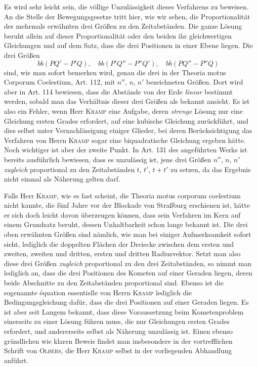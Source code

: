 Es wird sehr leicht sein, die völlige Unzulässigkeit dieses Verfahrens zu beweisen. An die Stelle der Bewegungsgesetze tritt hier, wie wir sehen, die Proportionalität der mehrmals erwähnten drei Größen zu den Zeitabständen. Die ganze Lösung beruht allein auf dieser Proportionalität oder den beiden ihr gleichwertigen Gleichungen und auf dem Satz, dass die drei Positionen in einer Ebene liegen. Die drei Größen
\[
bb(PQ'-P'Q), \quad bb(P'Q''-P''Q'), \quad bb(PQ''-P''Q)
\]
sind, wie man sofort bemerken wird, genau die drei in der Theoria motus Corporum Coelestium, Art. 112, mit $n''$, $n$, $n'$ bezeichneten Größen. Dort wird aber in Art. 114 bewiesen, dass die Abstände von der Erde \emph{linear} bestimmt werden, sobald man das Verhältnis dieser drei Größen als bekannt ansieht. Es ist also ein Fehler, wenn Herr \textsc{Kramp} eine Aufgabe, deren \emph{strenge} Lösung nur eine Gleichung ersten Grades erfordert, auf eine kubische Gleichung zurückführt, und dies selbst unter Vernachlässigung einiger Glieder, bei deren Berücksichtigung das Verfahren von Herrn \textsc{Kramp} sogar eine biquadratische Gleichung ergeben hätte. Noch wichtiger ist aber der zweite Punkt. In Art. 131 des angeführten Werks ist bereits ausführlich bewiesen, dass es unzulässig ist, jene drei Größen $n''$, $n$, $n'$ \emph{zugleich} proportional zu den Zeitabständen $t$, $t'$, $t+t'$ zu setzen, da das Ergebnis nicht einmal als Näherung gelten darf.

Falls Herr \textsc{Kramp}, wie es fast scheint, die Theoria motus corporum coelestium nicht kannte, die fünf Jahre vor der Blockade von Straßburg erschienen ist, hätte er sich doch leicht davon überzeugen können, dass sein Verfahren im Kern auf einem Grundsatz beruht, dessen Unhaltbarkeit schon lange bekannt ist. Die drei oben erwähnten Größen sind nämlich, wie man bei einiger Aufmerksamkeit sofort sieht, lediglich die doppelten Flächen der Dreiecke zwischen dem ersten und zweiten, zweiten und dritten, ersten und dritten Radiusvektor. Setzt man also diese drei Größen \emph{zugleich} proportional zu den drei Zeitabständen, so nimmt man lediglich an, dass die drei Positionen des Kometen auf einer Geraden liegen, deren beide Abschnitte zu den Zeitabständen proportional sind. Ebenso ist die sogenannte équation essentielle von Herrn \textsc{Kramp} lediglich die Bedingungsgleichung dafür, dass die drei Positionen auf einer Geraden liegen. Es ist aber seit Langem bekannt, dass diese Voraussetzung beim Kometenproblem einerseits zu einer Lösung führen muss, die nur Gleichungen ersten Grades erfordert, und andererseits selbst als Näherung unzulässig ist. Einen ebenso gründlichen wie klaren Beweis findet man insbesondere in der vortrefflichen Schrift von \textsc{Olbers}, die Herr \textsc{Kramp} selbst in der vorliegenden Abhandlung anführt.
